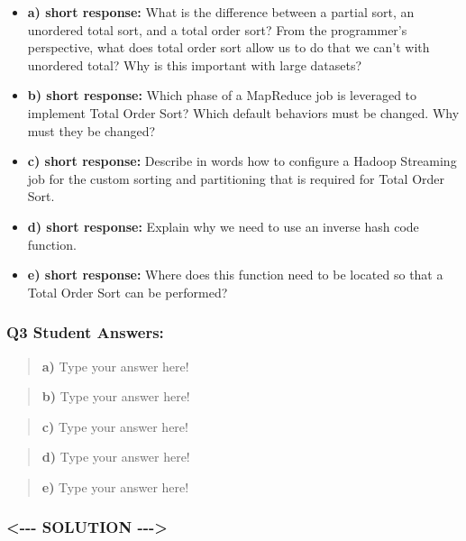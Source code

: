 \documentclass[11pt]{article}
\begin{document}
\begin{itemize}
\item
  \textbf{a) short response:} What is the difference between a partial
  sort, an unordered total sort, and a total order sort? From the
  programmer's perspective, what does total order sort allow us to do
  that we can't with unordered total? Why is this important with large
  datasets?
\item
  \textbf{b) short response:} Which phase of a MapReduce job is
  leveraged to implement Total Order Sort? Which default behaviors must
  be changed. Why must they be changed?
\item
  \textbf{c) short response:} Describe in words how to configure a
  Hadoop Streaming job for the custom sorting and partitioning that is
  required for Total Order Sort.
\item
  \textbf{d) short response:} Explain why we need to use an inverse hash
  code function.
\item
  \textbf{e) short response:} Where does this function need to be
  located so that a Total Order Sort can be performed?
\end{itemize}

    \subsubsection{Q3 Student Answers:}\label{q3-student-answers}

\begin{quote}
\textbf{a)} Type your answer here!
\end{quote}

\begin{quote}
\textbf{b)} Type your answer here!
\end{quote}

\begin{quote}
\textbf{c)} Type your answer here!
\end{quote}

\begin{quote}
\textbf{d)} Type your answer here!
\end{quote}

\begin{quote}
\textbf{e)} Type your answer here!
\end{quote}

    \subsubsection{\textless{}-\/-\/- SOLUTION
-\/-\/-\textgreater{}}\label{solution----}
\end{document}
